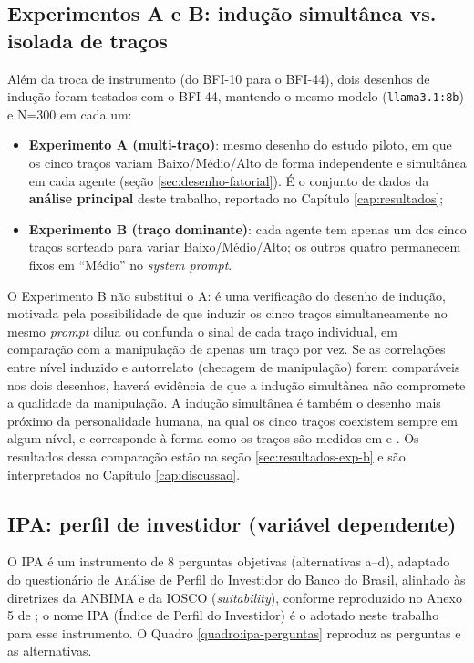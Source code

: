 \subsection{Experimentos A e B: indução simultânea vs. isolada de traços}
\label{sec:exp-a-b}

Além da troca de instrumento (do BFI-10 para o BFI-44), dois desenhos de
indução foram testados com o BFI-44, mantendo o mesmo modelo
(\texttt{llama3.1:8b}) e N=300 em cada um:

\begin{itemize}
    \item \textbf{Experimento A (multi-traço)}: mesmo desenho do estudo
    piloto, em que os cinco traços variam Baixo/Médio/Alto de forma
    independente e simultânea em cada agente (seção
    \ref{sec:desenho-fatorial}). É o conjunto de dados da \textbf{análise
    principal} deste trabalho, reportado no Capítulo \ref{cap:resultados};
    \item \textbf{Experimento B (traço dominante)}: cada agente tem
    apenas um dos cinco traços sorteado para variar Baixo/Médio/Alto; os
    outros quatro permanecem fixos em ``Médio'' no \textit{system prompt}.
\end{itemize}

O Experimento B não substitui o A: é uma verificação do desenho de indução,
motivada pela possibilidade de que induzir os cinco traços
simultaneamente no mesmo \textit{prompt} dilua ou confunda o sinal de
cada traço individual, em comparação com a manipulação de apenas um traço
por vez. Se as correlações entre nível induzido e autorrelato (checagem
de manipulação) forem comparáveis nos dois desenhos, haverá evidência de
que a indução simultânea não compromete a qualidade da manipulação. A
indução simultânea é também o desenho mais próximo da personalidade
humana, na qual os cinco traços coexistem sempre em algum nível, e
corresponde à forma como os traços são medidos em
 e . Os resultados
dessa comparação estão na seção \ref{sec:resultados-exp-b} e são
interpretados no Capítulo \ref{cap:discussao}.

\subsection{IPA: perfil de investidor (variável dependente)}

O IPA é um instrumento de 8 perguntas objetivas (alternativas a--d),
adaptado do questionário de Análise de Perfil do Investidor do Banco do
Brasil, alinhado às diretrizes da ANBIMA e da IOSCO
(\textit{suitability}), conforme reproduzido no Anexo 5 de
; o nome IPA (Índice de Perfil do Investidor)
é o adotado neste trabalho para esse instrumento. O Quadro
\ref{quadro:ipa-perguntas} reproduz as perguntas e as alternativas.

